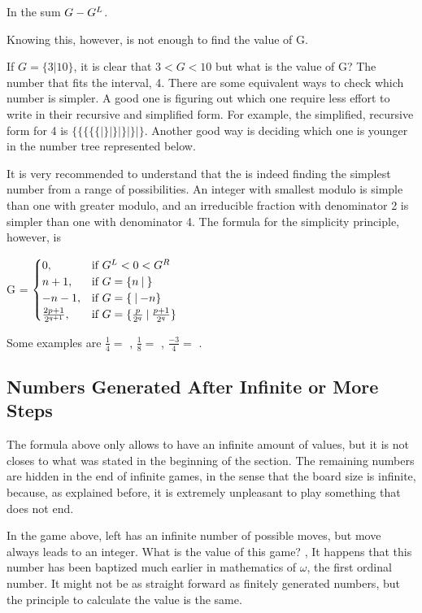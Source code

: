 In the sum $\mbox{$G$} - \mbox{$G^L$}$.

Knowing this, however, is not enough to find the value of G.

If $G = \{3 | 10\}$, it is clear that $3 < G < 10$ but what is the value of G? The  number that fits the interval, 4. There are some equivalent ways to check which number is simpler. A good one is figuring out which one require less effort to write in their recursive and simplified form. For example, the simplified, recursive form for 4 is $\{\{\{\{\{|\}|\}|\}|\} | \}$. Another good way is deciding which one is younger in the number tree represented below.

It is very recommended to understand that the  is indeed finding the simplest number from a range of possibilities. An integer with smallest modulo is simple than one with greater modulo, and an irreducible fraction with denominator 2 is simpler than one with denominator 4. The formula for the simplicity principle, however, is 

G = 
$
\begin{cases}
	0, &\text{if } G^L < 0 < G^R\\
	n+1, &\text{if } \mbox{$G= \mbox{$\{n\:|\:\}$}$}\\
	-n-1, &\text{if } \mbox{$G= \mbox{$\{\:|\:{-}n\}$}$}\\
	\frac{2p + 1}{2^{q+1}}, &\text{if } \mbox{$G= \mbox{$\{\frac{p}{2^q}\:|\: \frac{p+1}{2^q}\}$}$}
\end{cases}
$

\vspace{0.6em}Some examples are $\frac{1}{4} =$ , $\frac{1}{8} =$ , $\frac{-3}{4} =$ .

\subsection*{Numbers Generated After Infinite or More Steps}

The formula above only allows \Gm{} to have an infinite amount of values, but it is not closes to what was stated in the beginning of the section. The remaining numbers are hidden in the end of infinite games, in the sense that the board size is infinite, because, as explained before, it is extremely unpleasant to play something that does not end. 



In the game above, left has an infinite number of possible moves, but  move always leads to an integer. What is the value of this game? , It happens that this number has been baptized much earlier in mathematics of $\omega$, the first ordinal number. It might not be as straight forward as finitely generated numbers, but the principle to calculate the value is the same.

